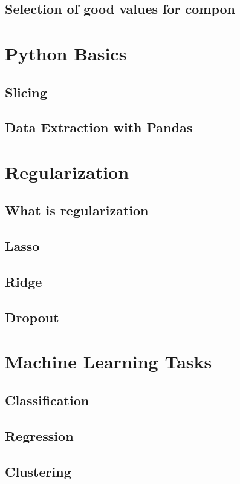 \subsection{Selection of good values for compon}

\section{Python Basics}

\subsection{Slicing}
\subsection{Data Extraction with Pandas}

\section{Regularization}
\subsection{What is regularization}
\subsection{Lasso}
\subsection{Ridge}
\subsection{Dropout}

\section{Machine Learning Tasks}

\subsection{Classification}
\subsection{Regression}
\subsection{Clustering}


